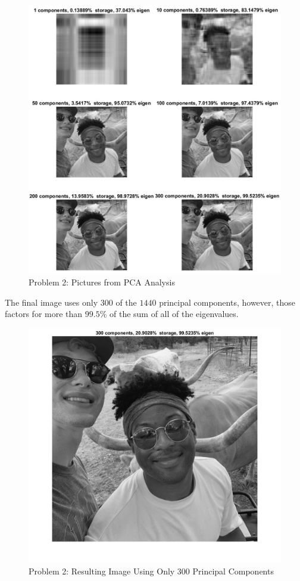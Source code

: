 \documentclass[12pt,letterpaper]{article}
\begin{document}
\begin{enumerate}
\begin{figure}[!h]
    \centering
    \includegraphics[width = 1\textwidth]{Z_Z_diff_3_2.jpg}
    \caption{Problem 2: Pictures from PCA Analysis}
\end{figure}

\end{enumerate}

\newpage
The final image uses only $300$ of the $1440$ principal components, however, those factors for more than $99.5\%$ of the sum of all of the eigenvalues.

\begin{figure}[!h]
    \centering
    \includegraphics[width = 1\textwidth]{Z_Z_BW_300.jpg}
    \caption{Problem 2: Resulting Image Using Only 300 Principal Components}
\end{figure}
\end{document}
